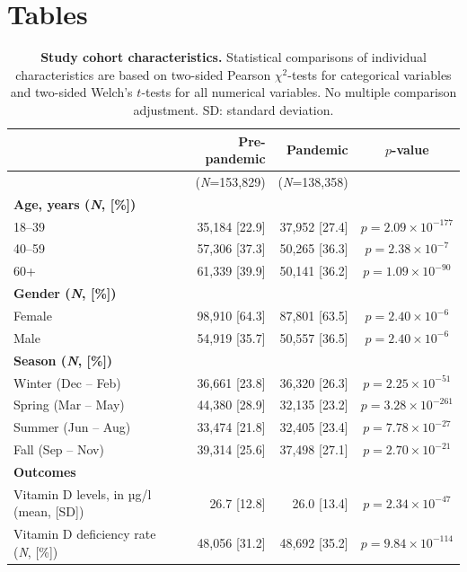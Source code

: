 \documentclass[12pt]{article}
\begin{document}
\section*{Tables}
\vspace{0.4cm}
\begin{table}[h!]
    \centering
\caption{\textbf{Study cohort characteristics.} Statistical comparisons of individual characteristics are based on two-sided Pearson $\chi^2$-tests for categorical variables and two-sided Welch's $t$-tests for all numerical variables. No multiple comparison adjustment. SD: standard deviation.} 
\label{tab:patient_characteristics}
\footnotesize
    \begin{tabular}{|l|r|r|c|}
    \hline
    \rowcolor{orange!20}& \textbf{Pre-pandemic} & \textbf{Pandemic} & \textbf{$p$-value}\\ \hline 
    \rowcolor{orange!20}& (\textit{N}=153,829)& (\textit{N}=138,358)&  \\ \hline
    \multicolumn{4}{|l|}{\textbf{Age, years (\textit{N}, [\%])} } \\\hline
    18--39 & 35,184 [22.9]& 37,952 [27.4]& $p = 2.09 \times 10^{-177}$\\ \hline
    40--59 & 57,306 [37.3]& 50,265 [36.3]& $p = 2.38 \times 10^{-7}$\\ \hline
    60+ & 61,339 [39.9]& 50,141 [36.2]& $p = 1.09 \times 10^{-90}$\\ \hline
    \multicolumn{4}{|l|}{\textbf{Gender (\textit{N}, [\%])} } \\ \hline
    Female& 98,910 [64.3]& 87,801 [63.5]& $p = 2.40 \times 10^{-6}$\\ \hline 
    Male& 54,919 [35.7]& 50,557 [36.5]& $p = 2.40 \times 10^{-6}$\\ \hline
 \multicolumn{4}{|l|}{\textbf{Season (\textit{N}, [\%])} } \\ \hline 
 Winter (Dec -- Feb)& 36,661 [23.8]& 36,320 [26.3]& $p = 2.25 \times 10^{-51}$\\ \hline 
 Spring (Mar -- May)& 44,380 [28.9]& 32,135 [23.2]& $p = 3.28 \times 10^{-261}$\\ \hline 
 Summer (Jun -- Aug)& 33,474 [21.8]& 32,405 [23.4]& $p = 7.78 \times 10^{-27}$\\ \hline 
 Fall (Sep -- Nov)& 39,314 [25.6]& 37,498 [27.1]& $p = 2.70 \times 10^{-21}$\\ \hline
    \multicolumn{4}{|l|}{\textbf{Outcomes}} \\ \hline
    {Vitamin D levels, in µg/l (mean, [SD])} & 26.7 [12.8] & 26.0 [13.4]& $p = 2.34 \times 10^{-47}$\\ \hline
    {Vitamin D deficiency rate (\textit{N}, [\%])} & 48,056 [31.2]& 48,692 [35.2]& $p = 9.84 \times 10^{-114}$\\ \hline
    \end{tabular}
\end{table}
\end{document}
